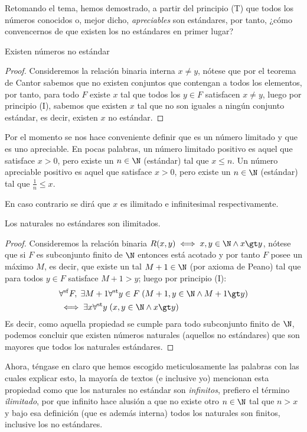 \documentclass[11pt,oneside,a4paper]{book}
\DeclareMathOperator{\st}{st}
\newcommand{\forallst}{\forall^{\st}}
\newcommand{\forallsf}{\forall^{\rm sf}}
\begin{document}
Retomando el tema, hemos demostrado, a partir del principio (T) que todos los números conocidos o, mejor dicho, \textit{apreciables} son estándares, por tanto, ¿cómo convencernos de que existen los no estándares en primer lugar?
\begin{thm}
Existen números no estándar
\end{thm}
\begin{proof}
Consideremos la relación binaria interna $x\neq y$, nótese que por el teorema de Cantor sabemos que no existen conjuntos que contengan a todos los elementos, por tanto, para todo $F$ existe $x$ tal que todos los $y\in F$ satisfacen $x\neq y$, luego por principio (I), sabemos que existen $x$ tal que no son iguales a ningún conjunto estándar, es decir, existen $x$ no estándar.
\end{proof}
\begin{mydef}
Por el momento se nos hace conveniente definir que es un número limitado y que es uno apreciable. En pocas palabras, un número limitado positivo es aquel que satisface $x\gt 0$, pero existe un $n\in\N$ (estándar) tal que $x\leq n$. Un número apreciable positivo es aquel que satisface $x\gt 0$, pero existe un $n\in\N$ (estándar) tal que $\frac 1n\leq x$.

En caso contrario se dirá que $x$ es ilimitado e infinitesimal respectivamente.
\end{mydef}
\begin{thm}
Los naturales no estándares son ilimitados.
\end{thm}
\begin{proof}
Consideremos la relación binaria $R(x,y)\iff x,y\in\N\wedge x\gt y$, nótese que si $F$ es subconjunto finito de $\N$ entonces está acotado y por tanto $F$ posee un máximo $M$, es decir, que existe un tal $M+1\in\N$ (por axioma de Peano) tal que para todos $y\in F$ satisface $M+1\gt y$; luego por principio (I):
\begin{align*}
&\forallsf F,\;\exists M+1\forallst y\in F\;(M+1,y\in\N\wedge M+1\gt y)\\
&\iff\exists x\forallst y\;(x,y\in\N\wedge x\gt y)
\end{align*}
Es decir, como aquella propiedad se cumple para todo subconjunto finito de $\N$, podemos concluir que existen números naturales (aquellos no estándares) que son mayores que todos los naturales estándares.
\end{proof}
Ahora, téngase en claro que hemos escogido meticulosamente las palabras con las cuales explicar esto, la mayoría de textos (e inclusive yo) mencionan esta propiedad como que los naturales no estándar son \textit{infinitos}, prefiero el término \textit{ilimitado}, por que infinito hace alusión a que no existe otro $n\in\N$ tal que $n\gt x$ y bajo esa definición (que es además interna) todos los naturales son finitos, inclusive los no estándares.
\end{document}
